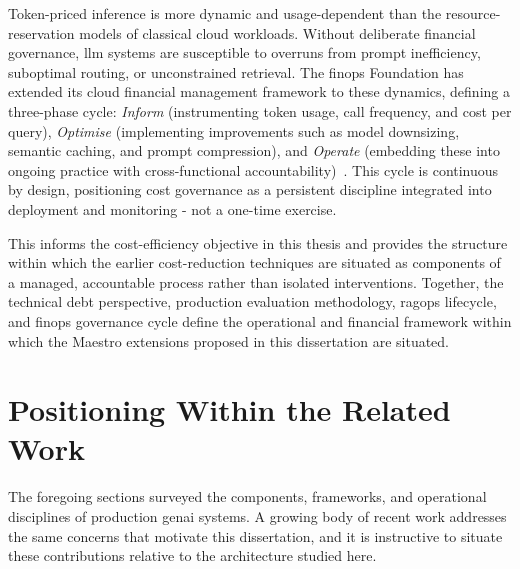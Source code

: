 Token-priced inference is more dynamic and usage-dependent than the resource-reservation models of classical cloud workloads. Without deliberate financial governance, \gls{llm} systems are susceptible to overruns from prompt inefficiency, suboptimal routing, or unconstrained retrieval. The \gls{finops} Foundation has extended its cloud financial management framework to these dynamics, defining a three-phase cycle: \textit{Inform} (instrumenting token usage, call frequency, and cost per query), \textit{Optimise} (implementing improvements such as model downsizing, semantic caching, and prompt compression), and \textit{Operate} (embedding these into ongoing practice with cross-functional accountability)~\cite{finops2024ai}. This cycle is continuous by design, positioning cost governance as a persistent discipline integrated into deployment and monitoring - not a one-time exercise.

This informs the cost-efficiency objective in this thesis and provides the structure within which the earlier cost-reduction techniques are situated as components of a managed, accountable process rather than isolated interventions. Together, the technical debt perspective, production evaluation methodology, \gls{ragops} lifecycle, and \gls{finops} governance cycle define the operational and financial framework within which the Maestro extensions proposed in this dissertation are situated.

\section{Positioning Within the Related Work}
\label{sec:related-work-positioning}

The foregoing sections surveyed the components, frameworks, and operational disciplines of production \gls{genai} systems. A growing body of recent work addresses the same concerns that motivate this dissertation, and it is instructive to situate these contributions relative to the architecture studied here.

